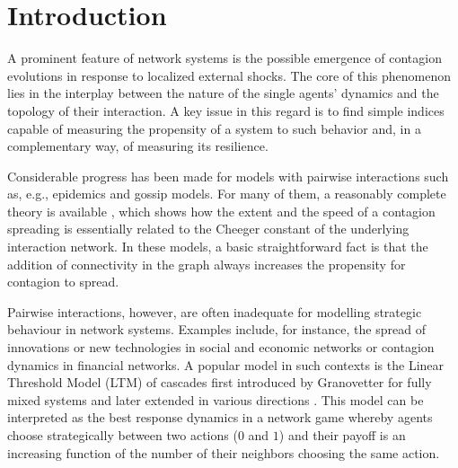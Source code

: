 \documentclass[12pt,twoside,reqno]{amsart}
\theoremstyle{definition}
\numberwithin{equation}{section}
\newcommand{\0}{\mathbf{0}}
\newcommand{\1}{\mathbf{1}}
\begin{document}
\renewcommand{\thefootnote}{}


\section{Introduction}




A prominent feature of network systems is the possible emergence of contagion evolutions in response to localized external shocks. 
The core of this phenomenon lies in the interplay between the nature of the single agents' dynamics and the topology of their interaction. A key issue in this regard is to find simple indices capable of measuring the propensity of a system to such behavior and, in a complementary way, of measuring its resilience. 

Considerable progress has been made for models with pairwise interactions such as, e.g., epidemics and gossip models. For many of them, a reasonably complete theory is available \cite{DM:2010}, which shows how the extent and the speed of a contagion spreading is essentially related to the Cheeger constant of the underlying interaction network. In these models, a basic straightforward fact is that the addition of connectivity in the graph always increases the propensity for contagion to spread.

Pairwise interactions, however, are often inadequate for modelling strategic behaviour in network systems. Examples include, for instance, the spread of innovations or new technologies in social and economic networks or contagion dynamics in financial networks. A popular model in such contexts is the Linear Threshold Model (LTM) of cascades first introduced by Granovetter for fully mixed systems \cite{mG:1978} and later extended in various directions  \cite{sM:2000, djW:2002, fVR:2007, EK:2010}. This model can be interpreted as the best response dynamics in a network game whereby agents choose strategically between two actions ($0$ and $1$) and their payoff is an increasing function of the number of their neighbors choosing the same action. 
\end{document}
